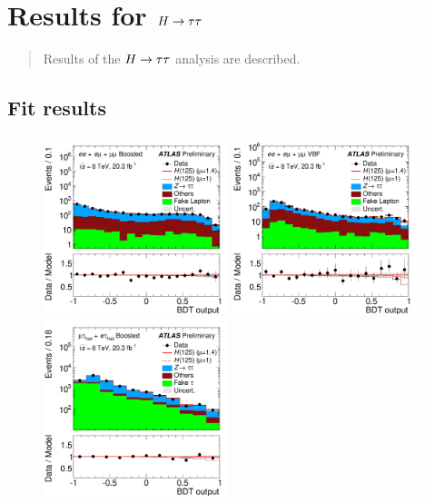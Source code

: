 \chapter[results][results]{Results for $H\rightarrow\tau\tau$}
\label{chap:results}

\begin{quote}
Results of the $H\rightarrow\tau\tau$ analysis are described.
\end{quote}

\section{Fit results}
\label{sec:results-fit-results}

\begin{figure}[tp]
  \centering
  \includegraphics[width=0.48\textwidth]{figures/ATLAS-CONF-2014-061/fig_08b}
  \includegraphics[width=0.48\textwidth]{figures/ATLAS-CONF-2014-061/fig_08a}
  \includegraphics[width=0.48\textwidth]{figures/ATLAS-CONF-2014-061/fig_08d}

\end{figure}
